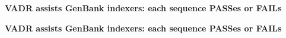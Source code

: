 \documentclass[landscape]{slides}
\begin{document}
\begin{slide}
\begin{center}
\large{\textbf{VADR assists GenBank indexers: each sequence PASSes or FAILs}}
\end{center}


\vfill
\end{slide}
\begin{slide}
\begin{center}
\large{\textbf{VADR assists GenBank indexers: each sequence PASSes or FAILs}}
\end{center}


\vfill
\end{slide}
\end{document}
